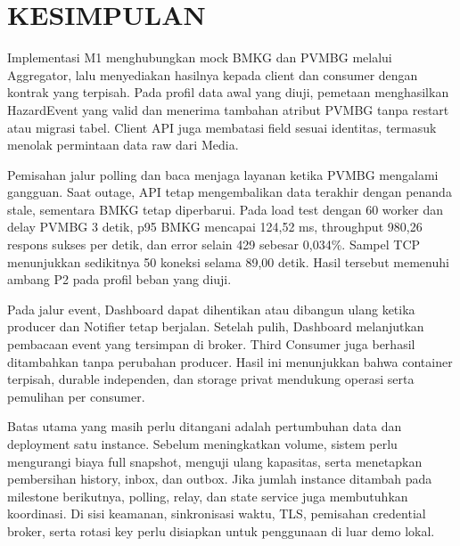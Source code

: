 \chapter{KESIMPULAN}
Implementasi M1 menghubungkan mock BMKG dan PVMBG melalui Aggregator, lalu menyediakan hasilnya kepada client dan consumer dengan kontrak yang terpisah. Pada profil data awal yang diuji, pemetaan menghasilkan HazardEvent yang valid dan menerima tambahan atribut PVMBG tanpa restart atau migrasi tabel. Client API juga membatasi field sesuai identitas, termasuk menolak permintaan data raw dari Media.

Pemisahan jalur polling dan baca menjaga layanan ketika PVMBG mengalami gangguan. Saat outage, API tetap mengembalikan data terakhir dengan penanda stale, sementara BMKG tetap diperbarui. Pada load test dengan 60 worker dan delay PVMBG 3 detik, p95 BMKG mencapai 124,52 ms, throughput 980,26 respons sukses per detik, dan error selain 429 sebesar 0,034\%. Sampel TCP menunjukkan sedikitnya 50 koneksi selama 89,00 detik. Hasil tersebut memenuhi ambang P2 pada profil beban yang diuji.

Pada jalur event, Dashboard dapat dihentikan atau dibangun ulang ketika producer dan Notifier tetap berjalan. Setelah pulih, Dashboard melanjutkan pembacaan event yang tersimpan di broker. Third Consumer juga berhasil ditambahkan tanpa perubahan producer. Hasil ini menunjukkan bahwa container terpisah, durable independen, dan storage privat mendukung operasi serta pemulihan per consumer.

Batas utama yang masih perlu ditangani adalah pertumbuhan data dan deployment satu instance. Sebelum meningkatkan volume, sistem perlu mengurangi biaya full snapshot, menguji ulang kapasitas, serta menetapkan pembersihan history, inbox, dan outbox. Jika jumlah instance ditambah pada milestone berikutnya, polling, relay, dan state service juga membutuhkan koordinasi. Di sisi keamanan, sinkronisasi waktu, TLS, pemisahan credential broker, serta rotasi key perlu disiapkan untuk penggunaan di luar demo lokal.
